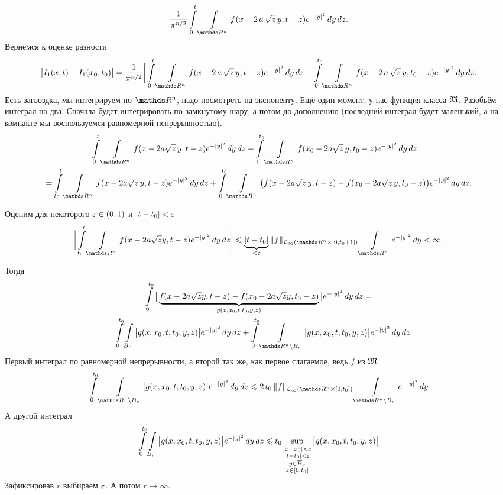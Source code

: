 \begin{Proof}
\begin{multline*}
   \frac1{\pi^{n/2}}\int\limits_0^t \Gint{\R^n}f(x-2\,a\,\sqrt z\,y,t-z)e^{-|y|^2}\,dy\,dz.
\end{multline*}
Вернёмся к оценке разности
\[
   \big|I_1(x,t)-I_1(x_0,t_0)\big| = 
   \frac1{\pi^{n/2}}\bigg|
   \int\limits_0^t \Gint{\R^n}f(x-2\,a\,\sqrt z\,y,t-z)e^{-|y|^2}\,dy\,dz - 
   \int\limits_0^{t_0} \Gint{\R^n}f(x-2\,a\,\sqrt z\,y,t_0-z)e^{-|y|^2}\,dy\,dz.
\]
  Есть загвоздка, мы интегрируем по $\R^n$, надо посмотреть на экспоненту. Ещё один момент, у нас функция класса $\mathfrak M$. Разобьём интеграл на два. Сначала будет интегрировать по замкнутому шару, а потом до дополнению (последний интеграл будет маленький, а на компакте мы воспользуемся равномерной непрерывностью). 
\begin{multline*}
\int\limits_0^t \Gint{\R^n}f(x-2a\sqrt z\,y,t-z)e^{-|y|^2}\,dy\,dz -
\int\limits_0^{t_0} \Gint{\R^n}f(x_0-2a\sqrt z\,y,t_0-z)e^{-|y|^2}\,dy\,dz=\\
=
\int\limits_{t_0}^t \Gint{\R^n}f(x-2a\sqrt z\,y,t-z)e^{-|y|^2}\,dy\,dz +
\int\limits_{0}^{t_0} \Gint{\R^n}
  \big(f(x-2a\sqrt z\,y,t-z)-f(x_0-2a\sqrt z\,y,t_0-z)\big)e^{-|y|^2}\,dy\,dz.
\end{multline*}

Оценим для некоторого $\varepsilon\in(0,1)$ и $|t-t_0|<\varepsilon$
\[
  \bigg|\int\limits_{t_0}^t\Gint{\R^n}f(x-2a\sqrt zy,t-z)e^{-|y|^2}\,dy\,dz\bigg|\le\underbrace{|t-t_0|}_{<\e}\|f\|_{\L_{\infty}(\R^n\times[0,t_0+1])}\Gint{\R^n}e^{-|y|^2}\,dy<\infty\
\]

Тогда
\begin{multline*}
  \int\limits_0^{t_0}\big|\underbrace{f(x-2a\sqrt z y,t-z)-f(x_0-2a\sqrt z y,t_0-z)}_{g(x,x_0,t,t_0,y,z)}\big|e^{-|y|^2}\,dy\,dz = \\ =
  \int\limits_0^{t_0}\Gint{B_r}\big|g(x,x_0,t,t_0,y,z)\big|e^{-|y|^2}\,dy\,dz + 
  \int\limits_0^{t_0}\Gint{\R^n\dd B_r}\big|g(x,x_0,t,t_0,y,z)\big|e^{-|y|^2}\,dy\,dz
\end{multline*}
Первый интеграл по равномерной непрерывности, а второй так же, как первое слагаемое, ведь $f$ из $\mathfrak M$
  \[\int\limits_0^{t_0}\Gint{\R^n\dd B_r}\big|g(x,x_0,t,t_0,y,z)\big|e^{-|y|^2}\,dy\,dz\le
  2\,t_0\,\|f\|_{\L_\infty\left(\R^n\times[0,t_0]\right)}\Gint{\R^n\dd B_r}e^{-|y|^2}\,dy
\]
А другой интеграл
\[
  \int\limits_0^{t_0}\int\limits_{B_r}\big|g(x,x_0,t,t_0,y,z)\big|e^{-|y|^2}\,dy\,dz\leqslant
 t_0\sup\limits_{\substack{|x-x_0|<\varepsilon\\|t-t_0|<\varepsilon\\y\in \overline{B}_r\\ z\in[0,t_0]}} \big|g(x,x_0,t,t_0,y,z)\big|
\]
Зафиксировав $r$ выбираем $\varepsilon$. А потом $r\to\infty$.


\end{Proof}

